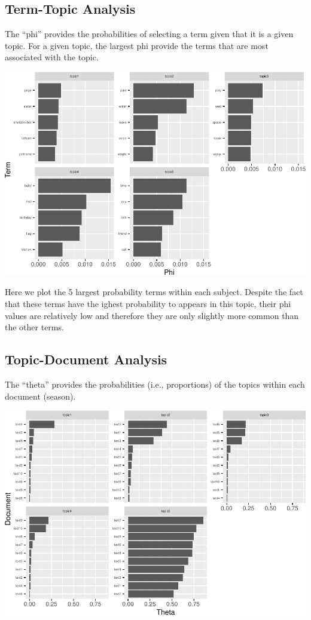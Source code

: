 \documentclass[
]{article}
\begin{document}
\hypertarget{term-topic-analysis}{%
\subsection{Term-Topic Analysis}\label{term-topic-analysis}}

The ``phi'' provides the probabilities of selecting a term given that it
is a given topic. For a given topic, the largest phi provide the terms
that are most associated with the topic.

\includegraphics{report_files/figure-latex/unnamed-chunk-62-1.pdf}

Here we plot the 5 largest probability terms within each subject.
Despite the fact that these terms have the ighest probability to appears
in this topic, their phi values are relatively low and therefore they
are only slightly more common than the other terms.

\hypertarget{topic-document-analysis}{%
\subsection{Topic-Document Analysis}\label{topic-document-analysis}}

The ``theta'' provides the probabilities (i.e., proportions) of the
topics within each document (season).

\includegraphics{report_files/figure-latex/unnamed-chunk-63-1.pdf}
\end{document}
